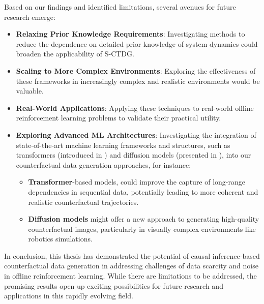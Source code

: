 Based on our findings and identified limitations,
several avenues for future research emerge:
\begin{itemize}
    \item \textbf{Relaxing Prior Knowledge Requirements}: Investigating
    methods to reduce the dependence on detailed prior knowledge of
    system dynamics could broaden the applicability of S-CTDG.
    \item \textbf{Scaling to More Complex Environments}: Exploring
    the effectiveness of these frameworks in increasingly complex
    and realistic environments would be valuable.
    \item \textbf{Real-World Applications}: Applying these
    techniques to real-world offline reinforcement learning problems
    to validate their practical utility.
    \item \textbf{Exploring Advanced ML Architectures}:
    Investigating the integration of state-of-the-art machine
    learning frameworks and structures, such as transformers
    (introduced in \cite{vaswani2023attentionneed})
    and diffusion models
    (presented in \cite{sohldickstein2015deepunsupervisedlearningusing}),
    into our counterfactual data generation approaches,
    for instance:
    \begin{itemize}
        \item \textbf{Transformer}-based models, could improve the
        capture of long-range dependencies in sequential data,
        potentially leading to more coherent and realistic
        counterfactual trajectories.
        \item \textbf{Diffusion models} might offer a new approach
        to generating high-quality counterfactual images, particularly
        in visually complex environments like robotics simulations.
    \end{itemize}
\end{itemize}

In conclusion, this thesis has demonstrated the potential of causal
inference-based counterfactual data generation in addressing challenges
of data scarcity and noise in offline reinforcement learning.
While there are limitations to be addressed, the promising results
open up exciting possibilities for future research and applications in
this rapidly evolving field.